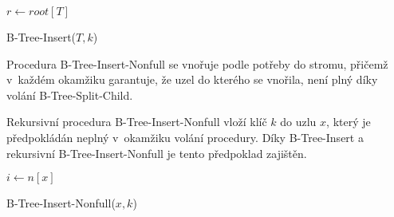 \begin{algorithm}[t]
\SetAlgoLined
{}

$r\longleftarrow root[T]$

\caption[B-Tree-Insert($T,k$)]{B-Tree-Insert($T,k$)\cite{Cormen:2001:IA:580470}}
\end{algorithm}

Procedura B-Tree-Insert-Nonfull se vnořuje podle potřeby do stromu, přičemž v~každém okamžiku garantuje, že uzel do kterého se vnořila, není plný díky volání B-Tree-Split-Child.

Rekursivní procedura B-Tree-Insert-Nonfull vloží klíč $k$ do uzlu $x$, který je předpokládán neplný v~okamžiku volání procedury.
Díky B-Tree-Insert a rekursivní B-Tree-Insert-Nonfull je tento předpoklad zajištěn.

\begin{algorithm}[t]
\SetAlgoLined
{}

$i \longleftarrow n[x]$\\

\caption[B-Tree-Insert-Nonfull($x,k$)]{B-Tree-Insert-Nonfull($x,k$)\cite{Cormen:2001:IA:580470}}
\end{algorithm}

